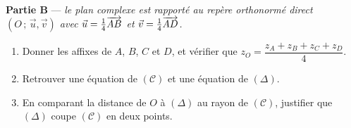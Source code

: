 \textbf{Partie B} — \textit{le plan complexe est rapporté au repère orthonormé
direct $(O\,;\,\vec{u},\vec{v})$ avec $\vec{u} = \frac14\overrightarrow{AB}$ et
$\vec{v} = \frac14\overrightarrow{AD}$.}
\begin{enumerate}
	\item Donner les affixes de $A$, $B$, $C$ et $D$, et vérifier que
	$z_O = \dfrac{z_A + z_B + z_C + z_D}{4}$.
	\item Retrouver une équation de $(\mathscr{C})$ et une équation de
	$(\Delta)$.
	\item En comparant la distance de $O$ à $(\Delta)$ au rayon de
	$(\mathscr{C})$, justifier que $(\Delta)$ coupe $(\mathscr{C})$ en deux
	points.
\end{enumerate}
